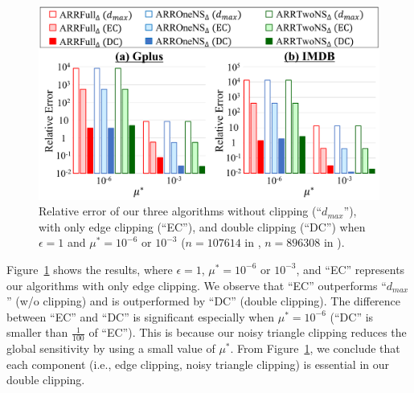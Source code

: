 {\begin{figure}[t]
  \centering
  \includegraphics[width=0.99\linewidth]{fig/res2_w_Lap_EC.pdf}
  
  \caption{Relative error of our three algorithms without clipping (``$d_{max}$''), with only edge clipping (``EC''), and double clipping (``DC'') when $\epsilon=1$ and $\mu^* = 10^{-6}$ or $10^{-3}$ ($n=107614$ in \GPlus{}, $n=896308$ in \IMDB{}).}
  \label{chap2-fig:res2_w_Lap_EC}
\end{figure}

Figure~\ref{chap2-fig:res2_w_Lap_EC} shows the results, where $\epsilon=1$, $\mu^* = 10^{-6}$ or $10^{-3}$, and ``EC'' represents our algorithms with only
edge clipping.
We observe that ``EC''
outperforms ``$d_{max}$'' (w/o clipping) and is outperformed by ``DC'' (double clipping).
The difference between ``EC'' and ``DC'' is significant especially when $\mu^* = 10^{-6}$ (``DC'' is smaller than $\frac{1}{100}$ of ``EC'').
This is because our noisy triangle clipping reduces the global sensitivity by using a small value of
$\mu^*$. 
From Figure~\ref{chap2-fig:res2_w_Lap_EC}, we conclude that each component (i.e.,
edge clipping, noisy triangle clipping) is essential in our double clipping.

}
